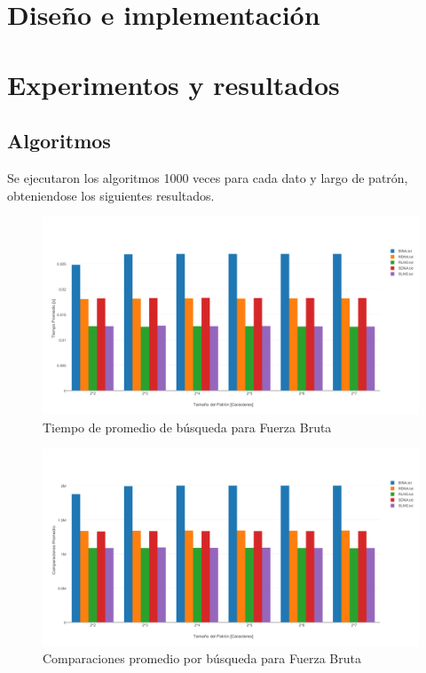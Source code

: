 \documentclass[14pt,letterpaper,hidelinks]{extarticle}
\begin{document}
\section{Diseño e implementación}

\newpage
\section{Experimentos y resultados}

	\subsection{Algoritmos}
		Se ejecutaron los algoritmos 1000 veces para cada dato y largo de patrón, obteniendose los siguientes resultados.

		\begin{figure}[ht!]
			\centering
			\includegraphics[scale=0.5]{img/tBF.pdf}
			\caption{Tiempo de promedio de búsqueda para Fuerza Bruta} \label{construccion}
		\end{figure}

	\newpage

		\begin{figure}[ht!]
			\centering
			\includegraphics[scale=0.5]{img/cBF.pdf}
			\caption{Comparaciones promedio por búsqueda para Fuerza Bruta} \label{construccion}
		\end{figure}
\end{document}
